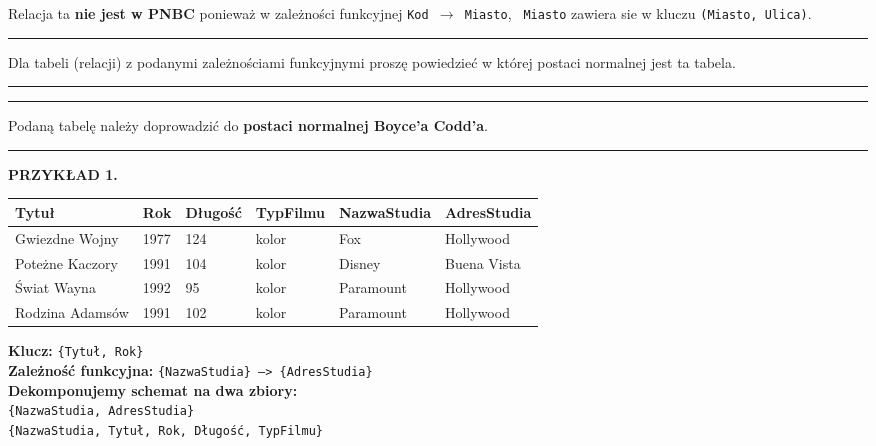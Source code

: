\documentclass[a5paper,6pt]{article}
\newcommand{\horrule}[1]{\rule{\linewidth}{#1}}
\begin{document}
    Relacja ta \textbf{nie jest w PNBC} ponieważ w zależności funkcyjnej
    \texttt{Kod $\rightarrow$ Miasto}, \texttt{ Miasto} zawiera sie w kluczu
    \texttt{(Miasto, Ulica)}.\\

\pagebreak

    \horrule{0.5pt}
    Dla tabeli (relacji) z podanymi zależnościami funkcyjnymi proszę powiedzieć
    w której postaci normalnej jest ta tabela.\\
    \horrule{0.5pt}

\pagebreak

    \horrule{0.5pt}
    Podaną tabelę należy doprowadzić do
    \textbf{postaci normalnej Boyce’a Codd’a}.\\
    \horrule{0.5pt}

    \textbf{PRZYKŁAD 1.}

    \vskip 0.5cm

\begin{adjustbox}{width=\columnwidth,center}
    \begin{tabular}{|l|l|l|l|l|l|}
        \hline
        \textbf{Tytuł} &
        \textbf{Rok} &
        \textbf{Długość} &
        \textbf{TypFilmu} &
        \textbf{NazwaStudia} &
        \textbf{AdresStudia}\\
        \hline
        Gwiezdne Wojny &
        1977 &
        124 &
        kolor &
        Fox &
        Hollywood \\
        \hline
        Poteżne Kaczory &
        1991 &
        104 &
        kolor &
        Disney &
        Buena Vista \\
        \hline
        Świat Wayna &
        1992 &
        95 &
        kolor &
        Paramount &
        Hollywood \\
        \hline
        Rodzina Adamsów &
        1991 &
        102 &
        kolor &
        Paramount &
        Hollywood \\
        \hline
        \end{tabular}
\end{adjustbox}

    \vskip 0.5cm

    \textbf{Klucz:} \texttt{\{Tytuł, Rok\}}\\
    \textbf{Zależność funkcyjna:} \texttt{\{NazwaStudia\} --> \{AdresStudia\}}\\

    \textbf{Dekomponujemy schemat na dwa zbiory:}\\
    \texttt{\{NazwaStudia, AdresStudia\}}\\
    \texttt{\{NazwaStudia, Tytuł, Rok, Długość, TypFilmu\}}\\
\end{document}
